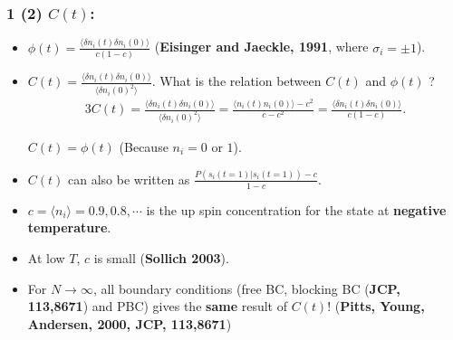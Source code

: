 \documentclass[8pt]{beamer}
\begin{document}

\begin{frame}
	\frametitle{1 (2) $C(t)$:}
	\begin{itemize}
		\item $\phi(t) = \frac{\langle \delta n_i(t) \delta n_i(0)\rangle}{c(1-c)}$ (\textbf{Eisinger and Jaeckle, 1991}, where $\sigma_i =\pm 1$).
		\item   $C(t) = \frac{\langle\delta n_i(t)\delta n_i (0)\rangle}{\langle \delta n_i(0)^2 \rangle}$. What is the relation between $C(t)$ and $\phi(t)$ ?  
		 \begin{alignat}{3}
			C(t) = \frac{\langle\delta n_i(t)\delta n_i (0)\rangle}{\langle \delta n_i(0)^2 \rangle} = \frac{\langle n_i(t)n_i(0)\rangle - c^2}{c-c^2} = \frac{\langle\delta n_i(t)\delta n_i (0)\rangle}{c(1-c)}  .
		\end{alignat}
		
	    $C(t)=\phi(t)$ (Because $n_i = 0 \text{ or } 1$).
		\item $C(t)$ can also be written as $\frac{P(s_i(t=1)| s_i(t=1))-c}{1-c}$.
		
		\item $c=\langle n_i \rangle =0.9, 0.8,\cdots$ is the up spin concentration for the state at \textbf{negative temperature}.
		\item At low $T$, $c$ is small (\textbf{Sollich 2003}).
		\item For $N\to \infty$, all boundary conditions (free BC, blocking BC (\textbf{JCP, 113,8671}) and PBC) gives the \textbf{same} result of $C(t)$! (\textbf{Pitts, Young, Andersen, 2000, JCP, 113,8671})  
	\end{itemize}	
\end{frame}
\end{document}
